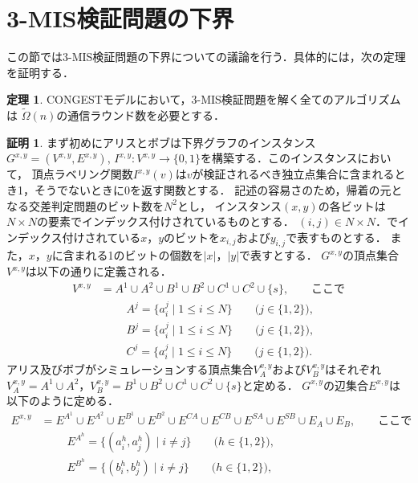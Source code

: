 \documentclass[12pt]{thesis}
\newcommand{\CONGEST}{\textsf{CONGEST}}
\theoremstyle{definition}
\newtheorem{theorem}{定理}[chapter]
\newtheorem*{prf*}{証明}
\begin{document}
\section{3-MIS検証問題の下界}
この節では3-MIS検証問題の下界についての議論を行う．具体的には，次の定理を証明する．
\begin{theorem}
{\CONGEST}モデルにおいて，3-MIS検証問題を解く全てのアルゴリズムは
$\tilde{\Omega} (n)$の通信ラウンド数を必要とする．
\end{theorem}
\begin{prf*}
まず初めにアリスとボブは下界グラフのインスタンス$G^{x,y} = (V^{x,y}, E^{x,y})$, 
$I^{x,y} : V^{x,y} \to \{0, 1\}$を構築する．このインスタンスにおいて，
頂点ラベリング関数$I^{x,y}(v)$は$v$が検証されるべき独立点集合に含まれるとき1，そうでないときに0を返す関数とする．
記述の容易さのため，帰着の元となる交差判定問題のビット数を$N^2$とし，
インスタンス$(x, y)$の各ビットは$N\times N$の要素でインデックス付けされているものとする．
$(i, j) \in N \times N$．でインデックス付けされている$x$，$y$のビットを$x_{i,j}$および$y_{i,j}$で表すものとする．
また，$x$，$y$に含まれる1のビットの個数を$|x|$，$|y|$で表すとする．
$G^{x,y}$の頂点集合$V^{x,y}$は以下の通りに定義される．
\begin{align*}
V^{x,y} &= A^{1} \cup A^{2} \cup B^{1} \cup B^{2} \cup C^{1} \cup C^{2} \cup \{s\}, \quad \quad \text{ここで}\\
&\phantom{=} \quad A^{j} = \{a^{j}_{i} \mid 1\leq i \leq N\} \quad \quad \text{($j \in \{1, 2\}$)}, \\
&\phantom{=} \quad B^{j} = \{a^{j}_{i} \mid 1\leq i \leq N\} \quad \quad \text{($j \in \{1, 2\}$)}, \\
&\phantom{=} \quad C^{j} = \{a^{j}_{i} \mid 1\leq i \leq N\} \quad \quad \text{($j \in \{1, 2\}$)}.
\end{align*}
アリス及びボブがシミュレーションする頂点集合$V^{x,y}_{A}$および$V^{x,y}_{B}$はそれぞれ
$V^{x,y}_{A} = A^{1} \cup A^{2}$，$V^{x,y}_{B} = B^{1} \cup B^{2} \cup C^{1} \cup C^{2} \cup \{s\}$と定める．
$G^{x,y}$の辺集合$E^{x,y}$は以下のように定める．
\begin{align*}
E^{x,y} &= E^{A^{1}} \cup E^{A^{2}} \cup E^{B^{1}} \cup E^{B^{2}} 
\cup E^{CA} \cup E^{CB} \cup E^{SA} \cup E^{SB} \cup E_{A} \cup E_{B}, \quad \quad \text{ここで}\\
&\phantom{=} \quad E^{A^{h}} = \{(a^{h}_{i}, a^{h}_{j})  \mid i \neq j\} \quad \quad \text{($h \in \{1, 2\}$)}, \\
&\phantom{=} \quad E^{B^{h}} = \{(b^{h}_{i}, b^{h}_{j})  \mid i \neq j\} \quad \quad \text{($h \in \{1, 2\}$)}, \\

\end{align*}
\end{prf*}
\end{document}
